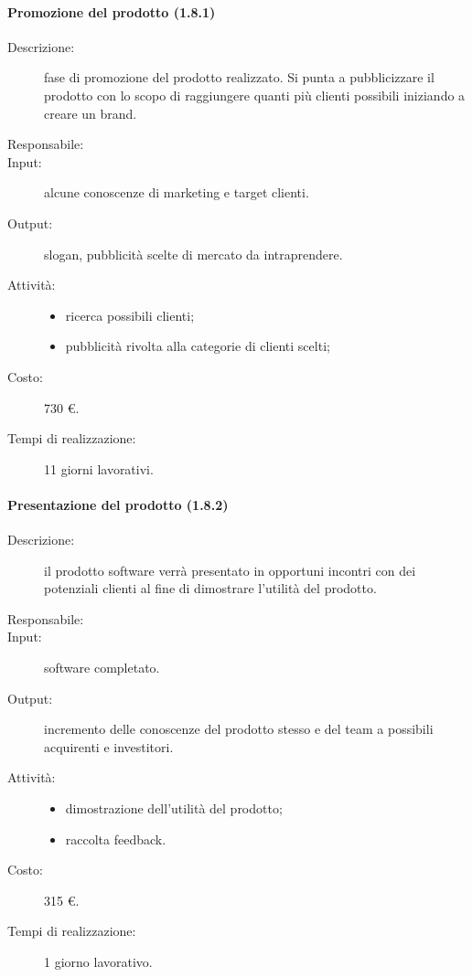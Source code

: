 \paragraph{Promozione del prodotto (1.8.1)}
\begin{description}
\item[Descrizione:] fase di promozione del prodotto realizzato. Si punta a pubblicizzare il prodotto con lo scopo di raggiungere quanti pi\`{u} clienti possibili iniziando a creare un brand.
\item[Responsabile:] 
\item[Input:] alcune conoscenze di marketing e target clienti.
\item[Output:] slogan, pubblicit\`{a} scelte di mercato da intraprendere.
\item[Attivit\`{a}:] 
\begin{center}
\begin{itemize}
\item ricerca possibili clienti;
\item pubblicit\`{a} rivolta alla categorie di clienti scelti;
\end{itemize}
\end{center}
\item[Costo:] 730 \euro{}.
\item[Tempi di realizzazione:] 11 giorni lavorativi.
\end{description}

\paragraph{Presentazione del prodotto (1.8.2)}
\begin{description}
\item[Descrizione:] il prodotto software verr\`{a} presentato in opportuni incontri con dei potenziali clienti al fine di dimostrare l'utilit\`{a} del prodotto.
\item[Responsabile:] 
\item[Input:] software completato.
\item[Output:] incremento delle conoscenze del prodotto stesso e del team a possibili acquirenti e investitori. 
\item[Attivit\`{a}:] 
\begin{center}
\begin{itemize}
\item dimostrazione dell'utilit\`{a} del prodotto;
\item raccolta feedback.
\end{itemize}
\end{center}
\item[Costo:] 315 \euro{}.
\item[Tempi di realizzazione:] 1 giorno lavorativo.
\end{description}
